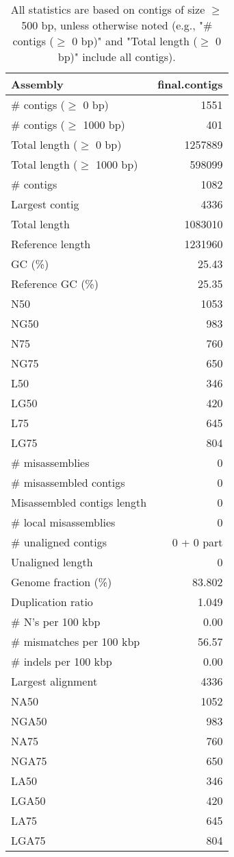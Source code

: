 \documentclass[12pt,a4paper]{article}
\begin{document}
\begin{table}[ht]
\begin{center}
\caption{All statistics are based on contigs of size $\geq$ 500 bp, unless otherwise noted (e.g., "\# contigs ($\geq$ 0 bp)" and "Total length ($\geq$ 0 bp)" include all contigs).}
\begin{tabular}{|l*{1}{|r}|}
\hline
Assembly & final.contigs \\ \hline
\# contigs ($\geq$ 0 bp) & 1551 \\ \hline
\# contigs ($\geq$ 1000 bp) & 401 \\ \hline
Total length ($\geq$ 0 bp) & 1257889 \\ \hline
Total length ($\geq$ 1000 bp) & 598099 \\ \hline
\# contigs & 1082 \\ \hline
Largest contig & 4336 \\ \hline
Total length & 1083010 \\ \hline
Reference length & 1231960 \\ \hline
GC (\%) & 25.43 \\ \hline
Reference GC (\%) & 25.35 \\ \hline
N50 & 1053 \\ \hline
NG50 & 983 \\ \hline
N75 & 760 \\ \hline
NG75 & 650 \\ \hline
L50 & 346 \\ \hline
LG50 & 420 \\ \hline
L75 & 645 \\ \hline
LG75 & 804 \\ \hline
\# misassemblies & 0 \\ \hline
\# misassembled contigs & 0 \\ \hline
Misassembled contigs length & 0 \\ \hline
\# local misassemblies & 0 \\ \hline
\# unaligned contigs & 0 + 0 part \\ \hline
Unaligned length & 0 \\ \hline
Genome fraction (\%) & 83.802 \\ \hline
Duplication ratio & 1.049 \\ \hline
\# N's per 100 kbp & 0.00 \\ \hline
\# mismatches per 100 kbp & 56.57 \\ \hline
\# indels per 100 kbp & 0.00 \\ \hline
Largest alignment & 4336 \\ \hline
NA50 & 1052 \\ \hline
NGA50 & 983 \\ \hline
NA75 & 760 \\ \hline
NGA75 & 650 \\ \hline
LA50 & 346 \\ \hline
LGA50 & 420 \\ \hline
LA75 & 645 \\ \hline
LGA75 & 804 \\ \hline
\end{tabular}
\end{center}
\end{table}
\end{document}
